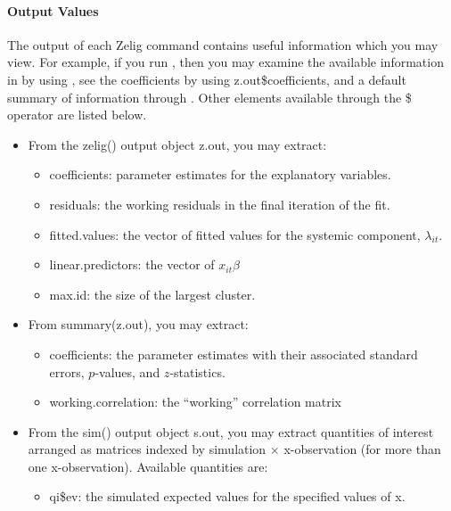 \documentclass[letterpaper,10pt,english]{sphinxmanual}
\begin{document}
\paragraph{Output Values}
\label{zelig-poissongee:output-values}
The output of each Zelig command contains useful information which you
may view. For example, if you run
, then you may
examine the available information in  by using
, see the coefficients by using z.out\$coefficients, and
a default summary of information through . Other
elements available through the \$ operator are listed below.
\begin{itemize}
\item {} 
From the zelig() output object z.out, you may extract:
\begin{itemize}
\item {} 
coefficients: parameter estimates for the explanatory variables.

\item {} 
residuals: the working residuals in the final iteration of the
fit.

\item {} 
fitted.values: the vector of fitted values for the systemic
component, \(\lambda_{it}\).

\item {} 
linear.predictors: the vector of \(x_{it}\beta\)

\item {} 
max.id: the size of the largest cluster.

\end{itemize}

\item {} 
From summary(z.out), you may extract:
\begin{itemize}
\item {} 
coefficients: the parameter estimates with their associated
standard errors, \(p\)-values, and \(z\)-statistics.

\item {} 
working.correlation: the “working” correlation matrix

\end{itemize}

\item {} 
From the sim() output object s.out, you may extract quantities of
interest arranged as matrices indexed by simulation \(\times\)
x-observation (for more than one x-observation). Available quantities
are:
\begin{itemize}
\item {} 
qi\$ev: the simulated expected values for the specified values of
x.


\end{itemize}
\end{itemize}
\end{document}
